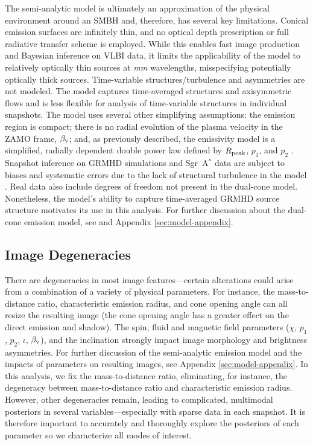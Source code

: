 \documentclass[linenumbers, twocolumn, tighten]{aastex701}
\def\sgra{Sgr~A$^*$\xspace}
\begin{document}
The semi-analytic model is ultimately an approximation of the physical environment around an SMBH and, therefore, has several key limitations. Conical emission surfaces are infinitely thin, and no optical depth prescription or full radiative transfer scheme is employed. While this enables fast image production and Bayesian inference on VLBI data, it limits the applicability of the model to relatively optically thin sources at \textit{mm} wavelengths, misspecifying potentially optically thick sources. Time-variable structures/turbulence and asymmetries are not modeled. The model captures time-averaged structures and axisymmetric flows and is less flexible for analysis of time-variable structures in individual snapshots. The model uses several other simplifying assumptions: the emission region is compact; there is no radial evolution of the plasma velocity in the ZAMO frame, $\beta_{\rm v}$; and, as previously described, the emissivity model is a simplified, radially dependent double power law defined by $R_{\rm peak}$, $p_1$, and $p_2$ \citep{Chang2024}. Snapshot inference on GRMHD simulations and \sgra data are subject to biases and systematic errors due to the lack of structural turbulence in the model \citep{Chang2024}. Real data also include degrees of freedom not present in the dual-cone model. Nonetheless, the model's ability to capture time-averaged GRMHD source structure motivates its use in this analysis. For further discussion about the dual-cone emission model, see \citealt{Chang2024} and Appendix \ref{sec:model-appendix}. 


\subsection{Image Degeneracies} \label{subsubsec:degeneracies}

There are degeneracies in most image features---certain alterations could arise from a combination of a variety of physical parameters. For instance, the mass-to-distance ratio, characteristic emission radius, and cone opening angle can all resize the resulting image (the cone opening angle has a greater effect on the direct emission and shadow). The spin, fluid and magnetic field parameters ($\chi$, $p_1$, $p_2$, $\iota$, $\beta_{\rm v}$), and the inclination strongly impact image morphology and brightness asymmetries. For further discussion of the semi-analytic emission model and the impacts of parameters on resulting images, see Appendix \ref{sec:model-appendix}. In this analysis, we fix the mass-to-distance ratio, eliminating, for instance, the degeneracy between mass-to-distance ratio and characteristic emission radius. However, other degeneracies remain, leading to complicated, multimodal posteriors in several variables---especially with sparse data in each snapshot. It is therefore important to accurately and thoroughly explore the posteriors of each parameter so we characterize all modes of interest.
\end{document}
